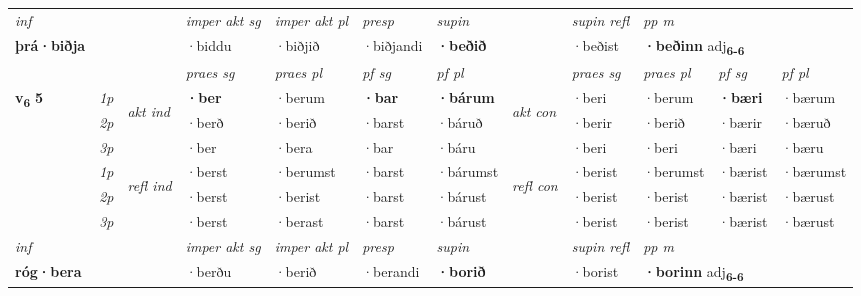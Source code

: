 \begin{longtable}[l]{X>{\footnotesize\itshape}llXXXXlXXXX}
   {\textit{inf}} & &  & \textit{imper akt sg} & \textit{imper akt pl}   & \textit{presp} & \textit{supin} && \textit{supin refl} & \textit{pp m} \\*
  {\textbf{þrá\allowbreak ·biðja}} & && ·biddu  & ·biðjið   & ·biðjandi &  \textbf{·beðið} && ·beðist & \multicolumn{2}{l}{\textbf{·beðinn} adj\textbf{\textsubscript{6-6}}} \\*

\midrule

 & &   & \textit{praes sg}  & \textit{praes pl}    & \textit{ pf sg} & \textit{pf pl} & & \textit{praes sg}  & \textit{praes pl}    & \textit{pf sg} & \textit{pf pl }  \\ \cmidrule{4-7} \cmidrule{9-12}
 \multirow{2}{*}{{{\textbf{v{\textsubscript{6}}} \Large{\textbf{5}}}}}  & 1p & \multirow{3}{*}{\begin{turn}{90}\textit{akt ind}\end{turn}} & \textbf{·ber} & ·berum & \textbf{·bar} & \textbf{·bárum} & \multirow{3}{*}{\begin{turn}{90}\textit{akt con}\end{turn}} &·beri & ·berum & \textbf{·bæri} & ·bærum\\*
 & 2p &  &  ·berð  & ·berið & ·barst & ·báruð & & ·berir & ·berið & ·bærir & ·bæruð \\*
 & 3p &  & ·ber & ·bera & ·bar & ·báru & & ·beri & ·beri& ·bæri & ·bæru \\*
\cmidrule{4-7} \cmidrule{9-12}
 & 1p & \multirow{3}{*}{\begin{turn}{90}\textit{refl ind}\end{turn}}  & ·berst & ·berumst & ·barst & ·bárumst & \multirow{3}{*}{\begin{turn}{90}\textit{refl con}\end{turn}}  &·berist & ·berumst & ·bærist & ·bærumst \\*
 & 2p &  & ·berst & ·berist & ·barst & ·bárust & &·berist & ·berist & ·bærist & ·bærust \\*
 & 3p  & & ·berst & ·berast & ·barst & ·bárust & & ·berist & ·berist& ·bærist & ·bærust \\*
\cmidrule{4-7} \cmidrule{9-12}

   {\textit{inf}} & &  & \textit{imper akt sg} & \textit{imper akt pl}   & \textit{presp} & \textit{supin} && \textit{supin refl} & \textit{pp m} \\*
  {\textbf{róg\allowbreak ·bera}} & && ·berðu  & ·berið   & ·berandi &  \textbf{·borið} && ·borist & \multicolumn{2}{l}{\textbf{·borinn} adj\textbf{\textsubscript{6-6}}} \\*


\end{longtable}

